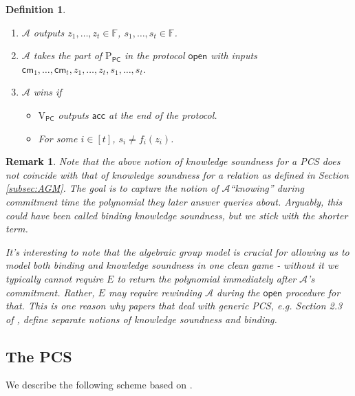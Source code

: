 \documentclass[11pt]{article} %
\newcommand{\F}{\ensuremath{\mathbb F}\xspace}
\newcommand{\adv}{\ensuremath{\mathcal A}\xspace}
\newcommand{\cm}{\ensuremath{\mathsf{cm}}\xspace}
\newcommand{\open}{\ensuremath{\mathsf{open}}\xspace}
\newcommand{\acc}{\ensuremath{\mathsf{acc}}\xspace}
\newcommand{\prvpc}{\ensuremath{\mathrm{P_{\mathsf{PC}}}}\xspace}
\newcommand{\verpc}{\ensuremath{\mathrm{V_{\mathsf{PC}}}}\xspace}
\newcommand{\ext}{\ensuremath{E}\xspace}
\newtheorem{dfn}[lemma]{Definition}
\newtheorem{remark}[lemma]{Remark}
\begin{document}
\begin{dfn}
\begin{itemize}
\begin{enumerate}
  \item \adv outputs $ z_1,\ldots,z_t \in \F$, $s_1,\ldots,s_t \in \F$.
  \item \adv takes the part of \prvpc in the protocol \open with inputs
  $\cm_1,\ldots,\cm_t,z_1,\ldots,z_t,s_1,\ldots,s_t$.
  \item $\adv$ wins if 
  \begin{itemize} 
   \item \verpc outputs \acc at the end of the protocol.
   \item For some $i\in [t]$, $s_i\neq f_i(z_i)$.
  \end{itemize}

 \end{enumerate}

\end{itemize}
\end{dfn}

\begin{remark}
 Note that the above notion of knowledge soundness for a PCS does not coincide with that of knowledge soundness for a \emph{relation} as defined in Section \ref{subsec:AGM}. The goal is to capture the notion of \adv ``knowing'' during commitment time the polynomial they later  answer queries about. Arguably, this could have been called \emph{binding knowledge soundness}, but we stick with the shorter term. 

 It's interesting to note that the algebraic group model is crucial for allowing us to  model both binding and knowledge soundness in one clean game - without
 it we typically cannot require \ext to return the polynomial immediately after \adv's commitment. Rather, \ext may require rewinding \adv during the \open procedure for that. This is one reason why papers that deal with generic PCS, e.g. Section 2.3 of \cite{hinf}, define separate notions of knowledge soundness and binding.
\end{remark}
\subsection{The PCS}

We describe the following scheme based on \cite{kate,sonic}.
\end{document}
